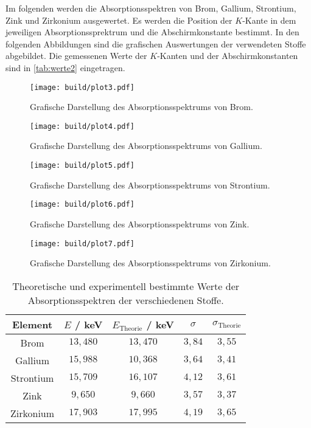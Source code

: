 Im folgenden werden die Absorptionsspektren von Brom, Gallium, Strontium, Zink und Zirkonium ausgewertet.
Es werden die Position der $K$-Kante in dem jeweiligen Absorptionssprektrum und die Abschirmkonstante bestimmt.
In den folgenden Abbildungen sind die grafischen Auswertungen der verwendeten Stoffe abgebildet.
Die gemessenen Werte der $K$-Kanten und der Abschirmkonstanten sind in \autoref{tab:werte2} eingetragen.

\begin{figure}[H]
  \centering
  \texttt{[image: build/plot3.pdf]}
  \caption{Grafische Darstellung des Absorptionsspektrums von Brom.}
  \label{fig:plot3}
\end{figure}

\begin{figure}[H]
  \centering
  \texttt{[image: build/plot4.pdf]}
  \caption{Grafische Darstellung des Absorptionsspektrums von Gallium.}
  \label{fig:plot4}
\end{figure}

\begin{figure}[H]
  \centering
  \texttt{[image: build/plot5.pdf]}
  \caption{Grafische Darstellung des Absorptionsspektrums von Strontium.}
  \label{fig:plot5}
\end{figure}

\begin{figure}[H]
  \centering
  \texttt{[image: build/plot6.pdf]}
  \caption{Grafische Darstellung des Absorptionsspektrums von Zink.}
  \label{fig:plot6}
\end{figure}

\begin{figure}[H]
  \centering
  \texttt{[image: build/plot7.pdf]}
  \caption{Grafische Darstellung des Absorptionsspektrums von Zirkonium.}
  \label{fig:plot7}
\end{figure}


\begin{table}[H]
  \caption{Theoretische und experimentell bestimmte Werte der Absorptionsspektren der verschiedenen Stoffe.}
  \centering
  \label{tab:werte2}
  \begin{tabular}{c| c c c c}
      \toprule
      Element  & $E$ / keV & $E_{\text{Theorie}}$ / keV & $\sigma$ & $\sigma_{\text{Theorie}}$ \\
      \midrule
      Brom      & $13,480$  & $13,470$  & $3,84$ & $3,55$ \\
      Gallium   & $15,988$  & $10,368$  & $3,64$ & $3,41$ \\
      Strontium & $15,709$  & $16,107$  & $4,12$ & $3,61$ \\
      Zink      & $9,650$   & $9,660$   & $3,57$ & $3,37$ \\
      Zirkonium & $17,903$  & $17,995$  & $4,19$ & $3,65$ \\
      \bottomrule
  \end{tabular}
\end{table}

